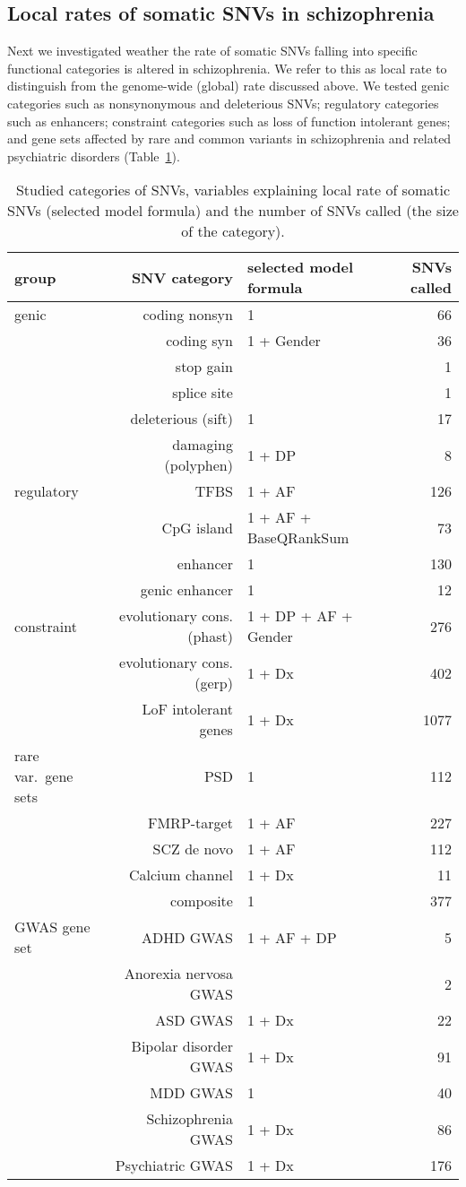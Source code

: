 \documentclass[letterpaper]{article}
\begin{document}
\subsection*{Local rates of somatic SNVs in schizophrenia}

Next we investigated weather the rate of somatic SNVs falling into specific
functional categories is altered in schizophrenia.  We refer to this as local
rate to distinguish from the genome-wide (global) rate discussed above.  We
tested genic categories such as nonsynonymous and deleterious SNVs; regulatory
categories such as enhancers; constraint categories such as loss of function
intolerant genes; and gene sets affected by rare and common variants in
schizophrenia and related psychiatric disorders (Table~\ref{tab:modsel}).

\begin{table}
\begin{tabular}{lrlr}
group & SNV category & selected model formula & SNVs called \\
\hline
\hline
genic & coding nonsyn & 1 & 66\\
 & coding syn & 1 + Gender & 36\\
 & stop gain &  & 1\\
 & splice site &  & 1\\
 & deleterious (sift) & 1 & 17\\
 & damaging (polyphen) & 1 + DP & 8\\
regulatory & TFBS & 1 + AF & 126\\
 & CpG island & 1 + AF + BaseQRankSum & 73\\
 & enhancer & 1 & 130\\
 & genic enhancer & 1 & 12\\
constraint & evolutionary cons. (phast) & 1 + DP + AF + Gender & 276\\
 & evolutionary cons. (gerp) & 1 + Dx & 402\\
 & LoF intolerant genes & 1 + Dx & 1077\\
rare var.~gene sets  & PSD & 1 & 112\\
 & FMRP-target & 1 + AF & 227\\
 & SCZ de novo & 1 + AF & 112\\
 & Calcium channel & 1 + Dx & 11\\
 & composite & 1 & 377\\
GWAS gene set & ADHD GWAS & 1 + AF + DP & 5\\
 & Anorexia nervosa GWAS &  & 2\\
 & ASD GWAS & 1 + Dx & 22\\
 & Bipolar disorder GWAS & 1 + Dx & 91\\
 & MDD GWAS & 1 & 40\\
 & Schizophrenia GWAS & 1 + Dx & 86\\
 & Psychiatric GWAS & 1 + Dx & 176\\
\end{tabular}
\caption{
	Studied categories of SNVs, variables explaining local rate of somatic
	SNVs (selected model formula) and the number of SNVs called (the size
	of the category).
}
\label{tab:modsel}
\end{table}
\end{document}

